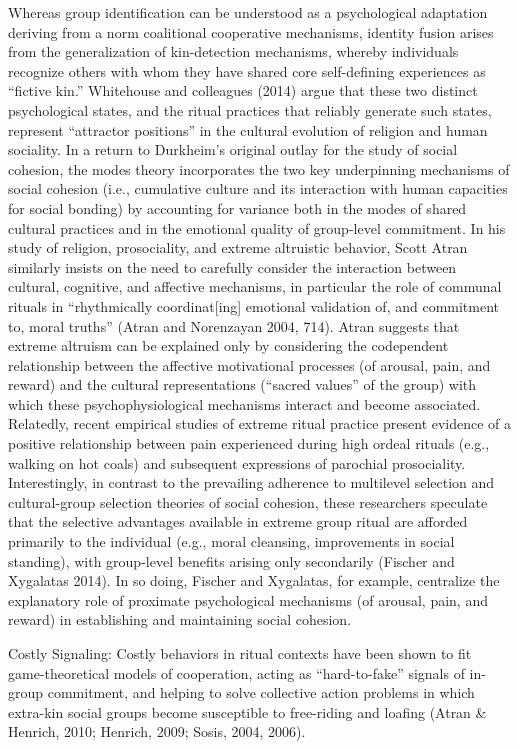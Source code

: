 Whereas group identification can be understood as a psychological adaptation deriving from a norm coalitional cooperative mechanisms, identity fusion arises from the generalization of kin-detection mechanisms, whereby individuals recognize others with whom they have shared core self-defining experiences as “fictive kin.” Whitehouse and colleagues (2014) argue that these two distinct psychological states, and the ritual practices that reliably generate such states, represent “attractor positions” in the cultural evolution of religion and human sociality. In a return to Durkheim’s original outlay for the study of social cohesion, the modes theory incorporates the two key underpinning mechanisms of social cohesion (i.e., cumulative culture and its interaction with human capacities for social bonding) by accounting for variance both in the modes of shared cultural practices and in the emotional quality of group-level commitment.
In his study of religion, prosociality, and extreme altruistic behavior, Scott Atran similarly insists on the need to carefully consider the interaction between cultural, cognitive, and affective mechanisms, in particular the role of communal rituals in “rhythmically coordinat[ing] emotional validation of, and commitment to, moral truths” (Atran and Norenzayan 2004, 714). Atran suggests that extreme altruism can be explained only by considering the codependent relationship between the affective motivational processes (of arousal, pain, and reward) and the cultural representations (“sacred values” of the group) with which these psychophysiological mechanisms interact and become associated.
Relatedly, recent empirical studies of extreme ritual practice present evidence of a positive relationship between pain experienced during high ordeal rituals (e.g., walking on hot coals) and subsequent expressions of parochial prosociality. Interestingly, in contrast to the prevailing adherence to multilevel selection and cultural-group selection theories of social cohesion, these researchers speculate that the selective advantages available in extreme group ritual are afforded primarily to the individual (e.g., moral cleansing, improvements in social standing), with group-level benefits arising only secondarily (Fischer and Xygalatas 2014). In so doing, Fischer and Xygalatas, for example, centralize the explanatory role of proximate psychological mechanisms (of arousal, pain, and reward) in establishing and maintaining social cohesion.


Costly Signaling:
Costly behaviors in ritual contexts have been shown to fit game-theoretical models of cooperation, acting as “hard-to-fake” signals of in-group commitment, and helping to solve collective action problems in which extra-kin social groups become susceptible to free-riding and loafing (Atran & Henrich, 2010; Henrich, 2009; Sosis, 2004, 2006).

